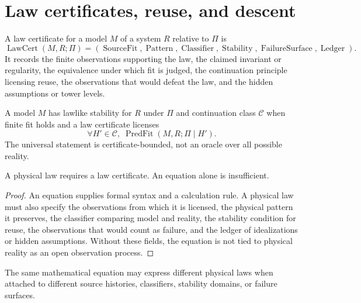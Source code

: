 \section{Law certificates, reuse, and descent}
\label{sec:law-certificates-reuse-descent}

\begin{definition}
\label{def:law-certificate}
A law certificate for a model $M$ of a system $R$ relative to $\Pi$ is
$$
\operatorname{LawCert}(M,R;\Pi)
=
(\operatorname{SourceFit},
\operatorname{Pattern},
\operatorname{Classifier},
\operatorname{Stability},
\operatorname{FailureSurface},
\operatorname{Ledger}).
$$
It records the finite observations supporting the law, the claimed invariant or regularity, the equivalence under which fit is judged, the continuation principle licensing reuse, the observations that would defeat the law, and the hidden assumptions or tower levels.
\end{definition}

\begin{definition}
\label{def:lawlike-stability}
A model $M$ has lawlike stability for $R$ under $\Pi$ and continuation class $\mathcal C$ when finite fit holds and a law certificate licenses
$$
\forall H'\in\mathcal C,\;
\operatorname{PredFit}(M,R;\Pi\mid H').
$$
The universal statement is certificate-bounded, not an oracle over all possible reality.
\end{definition}

\begin{theorem}
\label{thm:physical-law-not-merely-equation}
A physical law requires a law certificate. An equation alone is insufficient.
\end{theorem}

\begin{proof}
An equation supplies formal syntax and a calculation rule. A physical law must also specify the observations from which it is licensed, the physical pattern it preserves, the classifier comparing model and reality, the stability condition for reuse, the observations that would count as failure, and the ledger of idealizations or hidden assumptions. Without these fields, the equation is not tied to physical reality as an open observation process.
\end{proof}

\begin{corollary}
\label{cor:same-equation-different-laws}
The same mathematical equation may express different physical laws when attached to different source histories, classifiers, stability domains, or failure surfaces.
\end{corollary}

